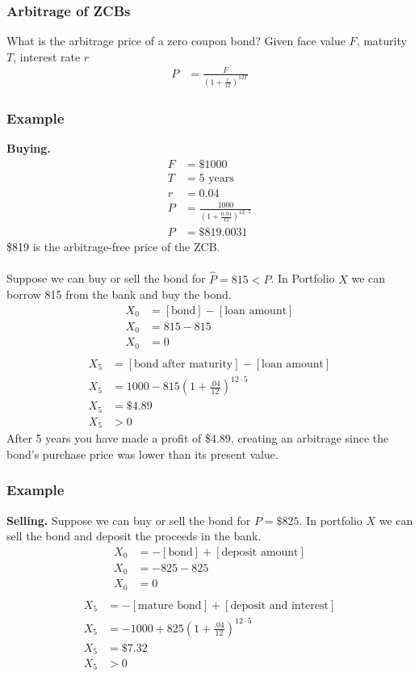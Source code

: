 \documentclass[12pt,letterpaper, twocolumn]{article}
\begin{document}
\subsubsection{Arbitrage of ZCBs}
What is the arbitrage price of a zero coupon bond? Given face value $F$, maturity $T$, interest rate $r$
\begin{align*}P&=\frac{F}{(1+\frac{r}{12})^{12T}}\end{align*}

\subsubsection*{Example}
\textbf{Buying.} 
\begin{align*}
    F &= \$1000\\
    T&= 5\text{ years}\\
    r&= 0.04\\
    P&= \frac{1000}{(1+\frac{0.04}{12})^{12\cdot 5}}\\
    P&= \$819.0031
\end{align*}
\$819 is the arbitrage-free price of the ZCB.
\\\\
Suppose we can buy or sell the bond for $\hat{P}=815<P$. In Portfolio $X$ we can borrow 815 from the bank and buy the bond. 
\begin{align*}
    X_0 &= [\text{bond}] - [\text{loan amount}]\\
    X_0 &= 815-815\\
    X_0 &= 0\\
\end{align*}
\begin{align*}
    X_5 &= [\text{bond after maturity}] - [\text{loan amount}]\\
    X_5 &= 1000-815(1+\frac{.04}{12})^{12\cdot5}\\
    X_5 &= \$4.89\\
    X_5 &> 0
\end{align*}
After 5 years you have made a profit of \$4.89, creating an arbitrage since the bond's purchase price was lower than its present value. 

\subsubsection*{Example}
\textbf{Selling.} 
Suppose we can buy or sell the bond for $P=\$825$. In portfolio $X$ we can sell the bond and deposit the proceeds in the bank. 
\begin{align*}
    X_0 &= -[\text{bond}] + [\text{deposit amount}]\\
    X_0 &= -825-825\\
    X_0 &= 0\\
\end{align*}
\begin{align*}
    X_5 &= -[\text{mature bond}] + [\text{deposit and interest}]\\
    X_5 &= -1000+825(1+\frac{.04}{12})^{12\cdot5}\\
    X_5 &= \$7.32\\
    X_5 &> 0
\end{align*}
\end{document}
